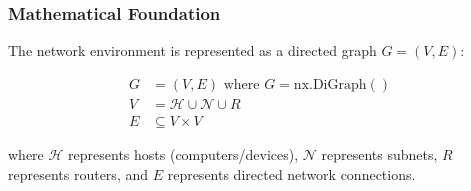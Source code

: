 \documentclass[12pt,oneside]{article}
\begin{document}

\subsubsection{Mathematical Foundation}
The network environment is represented as a directed graph $G = (V, E)$:

\begin{align}
G &= (V, E) \text{ where } G = \text{nx.DiGraph}() \\
V &= \mathcal{H} \cup \mathcal{N} \cup R \\
E &\subseteq V \times V
\end{align}

where $\mathcal{H}$ represents hosts (computers/devices), $\mathcal{N}$ represents subnets, $R$ represents routers, and $E$ represents directed network connections.
\end{document}
